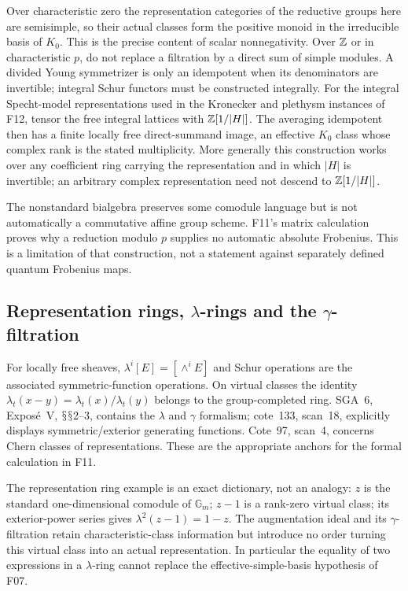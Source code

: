 \documentclass[11pt,a4paper]{article}
\renewcommand{\S}{\ensuremath{\mathsection}}
\newcommand{\fid}[1]{\textsf{#1}}\newcommand{\gate}[1]{\textsf{#1}}
\theoremstyle{named}\newtheorem{finding}{Finding}[section]
\theoremstyle{definition}\newtheorem{definition}[finding]{Definition}
\theoremstyle{remark}\newtheorem{remark}[finding]{Remark}
\begin{document}
Over characteristic zero the representation categories of the reductive groups here are semisimple, so their actual classes form the positive monoid in the irreducible basis of $K_0$. This is the precise content of scalar nonnegativity. Over $\mathbb Z$ or in characteristic $p$, do not replace a filtration by a direct sum of simple modules. A divided Young symmetrizer is only an idempotent when its denominators are invertible; integral Schur functors must be constructed integrally. For the integral Specht-model representations used in the Kronecker and plethysm instances of \fid{F12}, tensor the free integral lattices with $\mathbb Z[1/|H|]$. The averaging idempotent then has a finite locally free direct-summand image, an effective $K_0$ class whose complex rank is the stated multiplicity. More generally this construction works over any coefficient ring carrying the representation and in which $|H|$ is invertible; an arbitrary complex representation need not descend to $\mathbb Z[1/|H|]$.

The nonstandard bialgebra preserves some comodule language but is not automatically a commutative affine group scheme. \fid{F11}'s matrix calculation proves why a reduction modulo $p$ supplies no automatic absolute Frobenius. This is a limitation of that construction, not a statement against separately defined quantum Frobenius maps.

\subsection{Representation rings, $\lambda$-rings and the $\gamma$-filtration}
For locally free sheaves, $\lambda^i[E]=[\wedge^iE]$ and Schur operations are the associated symmetric-function operations. On virtual classes the identity $\lambda_t(x-y)=\lambda_t(x)/\lambda_t(y)$ belongs to the group-completed ring. SGA~6, Expos\'e~V, \S\S2--3, contains the $\lambda$ and $\gamma$ formalism; cote~133, scan~18, explicitly displays symmetric/exterior generating functions. Cote~97, scan~4, concerns Chern classes of representations. These are the appropriate anchors for the formal calculation in \fid{F11}.

The representation ring example is an exact dictionary, not an analogy: $z$ is the standard one-dimensional comodule of $\mathbb G_m$; $z-1$ is a rank-zero virtual class; its exterior-power series gives $\lambda^2(z-1)=1-z$. The augmentation ideal and its $\gamma$-filtration retain characteristic-class information but introduce no order turning this virtual class into an actual representation. In particular the equality of two expressions in a $\lambda$-ring cannot replace the effective-simple-basis hypothesis of \fid{F07}.
\end{document}
